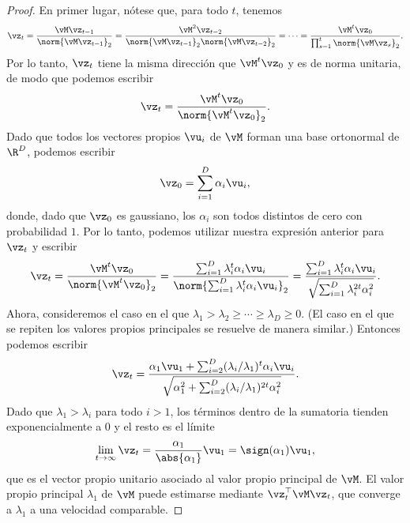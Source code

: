 \documentclass[../../book-main.tex]{subfiles}
\begin{document}
\begin{proof} En primer lugar, nótese que, para todo \(t\), tenemos
    \begin{equation}
        \vz_{t} = \frac{\vM\vz_{t - 1}}{\norm{\vM\vz_{t - 1}}_{2}} =
        \frac{\vM^{2}\vz_{t - 2}}{\norm{\vM\vz_{t -
        1}}_{2}\norm{\vM\vz_{t - 2}}_{2}} = \cdots =
        \frac{\vM^{t}\vz_{0}}{\prod_{s = 1}^{t}\norm{\vM\vz_{s}}_{2}}.
    \end{equation}
    Por lo tanto, \(\vz_{t}\) tiene la misma dirección que \(\vM^{t}\vz_{0}\)
    y es de norma unitaria, de modo que podemos escribir
    \begin{equation}
        \vz_{t} = \frac{\vM^{t}\vz_{0}}{\norm{\vM^{t}\vz_{0}}_{2}}.
    \end{equation}
    Dado que todos los vectores propios \(\vu_{i}\) de $\vM$ forman una
    base ortonormal de \(\R^{D}\), podemos escribir
    \begin{equation}
        \vz_{0} = \sum_{i = 1}^{D}\alpha_{i}\vu_{i},
    \end{equation}
    donde, dado que \(\vz_{0}\) es gaussiano, los \(\alpha_{i}\) son todos
    distintos de cero con probabilidad \(1\). Por lo tanto, podemos utilizar 
    nuestra expresión anterior para \(\vz_{t}\) y escribir
    \begin{equation}
        \vz_{t} = \frac{\vM^{t}\vz_{0}}{\norm{\vM^{t}\vz_{0}}_{2}} =
        \frac{\sum_{i =
        1}^{D}\lambda_{i}^{t}\alpha_{i}\vu_{i}}{\norm{\sum_{i =
        1}^{D}\lambda_{i}^{t}\alpha_{i}\vu_{i}}_{2}} = \frac{\sum_{i
        = 1}^{D}\lambda_{i}^{t}\alpha_{i}\vu_{i}}{\sqrt{\sum_{i =
        1}^{D}\lambda_{i}^{2t}\alpha_{i}^{2}}}.
    \end{equation}
    Ahora, consideremos el caso en el que \(\lambda_{1} > \lambda_{2}
    \geq \cdots \geq \lambda_{D} \geq 0\). (El caso en el que se repiten
    los valores propios principales se resuelve de manera similar.) 
    Entonces podemos escribir
    \begin{equation}
        \vz_{t} = \frac{\alpha_{1}\vu_{1} + \sum_{i =
        2}^{D}(\lambda_{i}/\lambda_{1})^{t}\alpha_{i}\vu_{i}}{\sqrt{\alpha_{1}^{2}
        + \sum_{i = 2}^{D}(\lambda_{i}/\lambda_{1})^{2t}\alpha_{i}^{2}}}.
    \end{equation}
    Dado que \(\lambda_{1} > \lambda_{i}\) para todo \(i > 1\), los
    términos dentro de la sumatoria tienden exponencialmente a \(0\) y
    el resto es el límite
    \begin{equation}
        \lim_{t \to \infty}\vz_{t} =
        \frac{\alpha_{1}}{\abs{\alpha_{1}}}\vu_{1} = \sign(\alpha_{1})\vu_{1},
    \end{equation}
    que es el vector propio unitario asociado al valor propio principal de \(\vM\). El valor propio principal
    \(\lambda_{1}\) de \(\vM\) puede estimarse mediante
    \(\vz_{t}^{\top}\vM\vz_{t}\), que converge 
    a \(\lambda_{1}\) a una velocidad comparable.
\end{proof}
\end{document}
